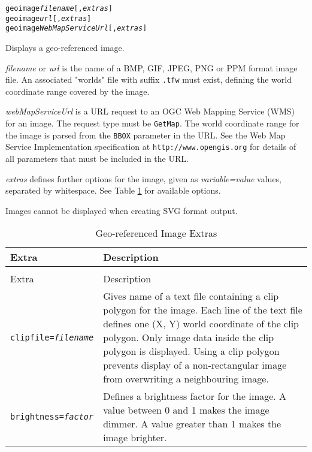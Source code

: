 \begin{alltt}
geoimage \textit{filename} [, \textit{extras} ]
geoimage \textit{url} [, \textit{extras} ]
geoimage \textit{WebMapServiceUrl} [, \textit{extras} ]
\end{alltt}

Displays a geo-referenced image.

\textit{filename} or
\textit{url}
is the name of a BMP, GIF, JPEG, PNG or PPM format image file.
An associated "worlds" file with suffix \texttt{.tfw} must exist,
defining the world coordinate range covered by the image.

\textit{webMapServiceUrl} is a URL request to an
OGC Web Mapping Service (WMS)
for an image.  The request type must be \texttt{GetMap}.
The world coordinate range for the image is parsed from the
\texttt{BBOX} parameter in the URL.
See the Web Map Service Implementation specification at
\texttt{http://www.opengis.org}
for details of all parameters that must be included in the URL.

\textit{extras} defines further options for the image, given as
\textit{variable=value} values, separated by whitespace.
See Table \ref{geoimageextras}
for available options.

Images cannot be displayed when creating SVG format output.

\begin{longtable}{|l|p{7cm}|}
\hline
\label{geoimageextras}
Extra & Description \\
\hline
\hline
\endfirsthead
\hline
\caption{Geo-referenced Image Extras} \\
\endfoot

\hline
Extra & Description \\
\hline
\hline
\endhead

\texttt{clipfile=\textit{filename}} &

Gives name of a text file containing a clip polygon for the image.
Each line of the text file defines one (X, Y) world coordinate
of the clip polygon.
Only image data inside the clip polygon is displayed.
Using a clip polygon prevents display of a non-rectangular image
from overwriting a neighbouring image. \\

\texttt{brightness=\textit{factor}} &

Defines a brightness factor for the image.
A value between 0 and 1 makes the image dimmer.
A value greater than 1 makes the image brighter. \\

\hline
\end{longtable}

